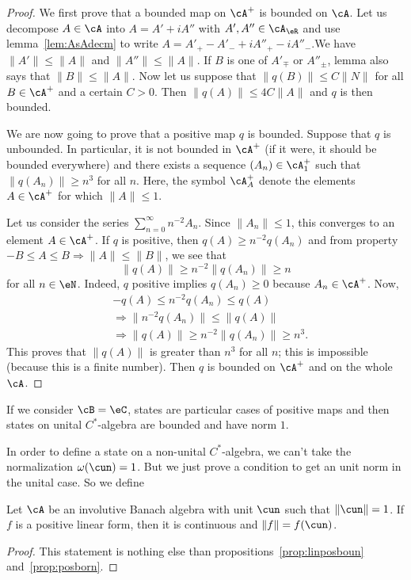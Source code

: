 \begin{proof}
	We first prove that a bounded map on $\cA^+$ is bounded on $\cA$. Let us decompose $A\in\cA$ into $A=A'+iA''$ with $A',A''\in\cA_{\eR}$ and use lemma~\ref{lem:AsAdecm} to write $A=A'_+-A'_-+iA''_+-iA''_-$.We have $\| A' \|\leq \| A \|$ and $\| A'' \|\leq \| A \|$. If $B$ is one of $A'_{\mp}$ or $A''_{\pm}$, lemma also says that $\| B \|\leq \| A \|$. Now let us suppose that $\| q(B) \| \leq C\| N \|$ for all $B\in\cA^+$ and a certain $C>0$. Then $\| q(A) \|\leq 4 C\| A \|$ and $q$ is then bounded.

	We are now going to prove that a positive map $q$ is bounded. Suppose that $q$ is unbounded. In particular, it is not bounded in $\cA^+$ (if it were, it should be bounded everywhere) and there exists a sequence $(A_n)\in\cA^+_1$ such that $\| q(A_n) \|\geq n^3$ for all $n$. Here, the symbol $\cA_A^+$ denote the elements $A\in\cA^+$ for which $\| A \|\leq 1$.

	Let us consider the series $\sum_{n=0}^{\infty}n^{-2}A_n$. Since $\| A_n \|\leq 1$, this converges to an element $A\in\cA^+$. If $q$ is positive, then $q(A)\geq n^{-2}q(A_n)$ and from property $-B\leq A\leq B\Rightarrow\| A \|\leq\| B \|$, we see that
	\[
		\| q(A) \|\geq n^{-2}\| q(A_n) \|\geq n
	\]
	for all $n\in\eN$. Indeed, $q$ positive implies $q(A_n)\geq 0$ because $A_n\in\cA^+$. Now,
	\begin{equation}
		\begin{split}
			&-q(A)\leq n^{-2}q(A_n)\leq q(A)\\
			&\Rightarrow \| n^{-2}q(A_n) \|\leq\| q(A) \|\\
			&\Rightarrow \| q(A) \|\geq n^{-2}\| q(A_n) \|\geq n^3.
		\end{split}
	\end{equation}
	This proves that $\| q(A) \|$ is greater than $n^3$ for all $n$; this is impossible (because this is a finite number). Then $q$ is bounded on $\cA^+$ and on the whole $\cA$.

\end{proof}

If we consider $\cB=\eC$, states are particular cases of positive maps and then states on unital $C^*$-algebra are bounded and have norm $1$.

In order to define a state on a non-unital $C^*$-algebra, we can't take the normalization $\omega(\cun)=1$. But we just prove a condition to get an unit norm in the unital case. So we define


\begin{proposition}
	Let $\cA$ be an involutive Banach algebra with unit $\cun$ such that $\| \cun \|=1$. If $f$ is a positive linear form, then it is continuous and $\| f \|=f(\cun)$. \label{prop_Dix214}
\end{proposition}
\begin{proof}
	This statement is nothing else than propositions~\ref{prop:linposboun} and~\ref{prop:posborn}.
\end{proof}


